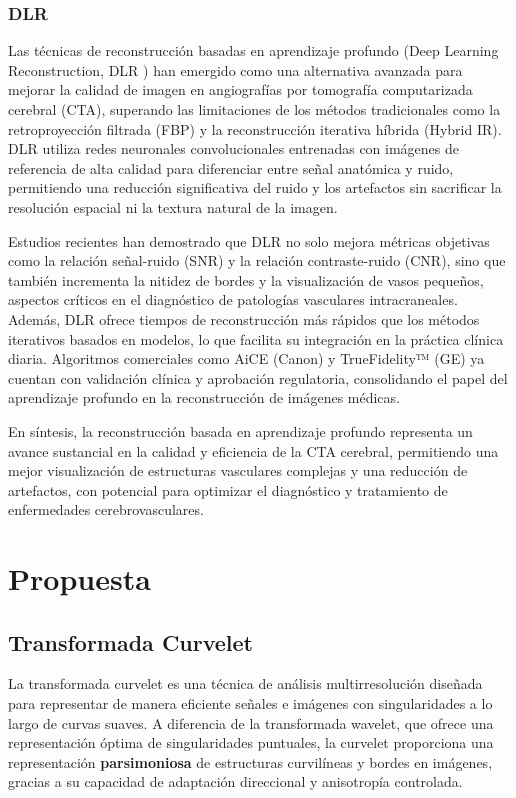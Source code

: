 \subsubsection{DLR}

Las técnicas de reconstrucción basadas en aprendizaje profundo (Deep Learning Reconstruction, DLR \cite{DLR}) han emergido como una alternativa avanzada para mejorar la calidad de imagen en angiografías por tomografía computarizada cerebral (CTA), superando las limitaciones de los métodos tradicionales como la retroproyección filtrada (FBP) y la reconstrucción iterativa híbrida (Hybrid IR). DLR utiliza redes neuronales convolucionales entrenadas con imágenes de referencia de alta calidad para diferenciar entre señal anatómica y ruido, permitiendo una reducción significativa del ruido y los artefactos sin sacrificar la resolución espacial ni la textura natural de la imagen.

Estudios recientes han demostrado que DLR no solo mejora métricas objetivas como la relación señal-ruido (SNR) y la relación contraste-ruido (CNR), sino que también incrementa la nitidez de bordes y la visualización de vasos pequeños, aspectos críticos en el diagnóstico de patologías vasculares intracraneales. Además, DLR ofrece tiempos de reconstrucción más rápidos que los métodos iterativos basados en modelos, lo que facilita su integración en la práctica clínica diaria. Algoritmos comerciales como AiCE (Canon) y TrueFidelity™ (GE) ya cuentan con validación clínica y aprobación regulatoria, consolidando el papel del aprendizaje profundo en la reconstrucción de imágenes médicas.

En síntesis, la reconstrucción basada en aprendizaje profundo representa un avance sustancial en la calidad y eficiencia de la CTA cerebral, permitiendo una mejor visualización de estructuras vasculares complejas y una reducción de artefactos, con potencial para optimizar el diagnóstico y tratamiento de enfermedades cerebrovasculares.

\section{Propuesta}

\subsection{Transformada Curvelet}

La transformada curvelet es una técnica de análisis multirresolución diseñada para representar de manera eficiente señales e imágenes con singularidades a lo largo de curvas suaves. A diferencia de la transformada wavelet, que ofrece una representación óptima de singularidades puntuales, la curvelet proporciona una representación \textbf{parsimoniosa} de estructuras curvilíneas y bordes en imágenes, gracias a su capacidad de adaptación direccional y anisotropía controlada\cite{Curvelets2000,FastCurveletTransform}.


